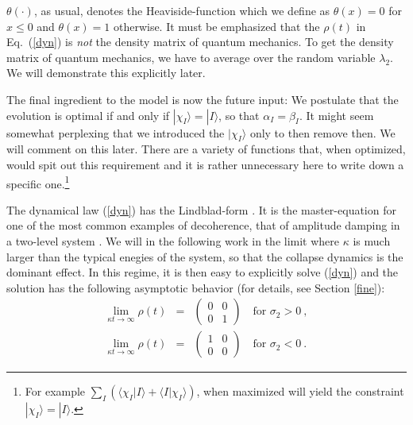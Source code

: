 \documentclass[12pt]{article}
\def\beqn{\begin{eqnarray}}
\def\eeqn{\end{eqnarray}}
\begin{document}
$\theta(\cdot)$, as usual, denotes the Heaviside-function which we define as $\theta(x) = 0$ for $x \leq 0$ and $\theta(x) =1$ otherwise.
It must be emphasized that the $\rho(t)$ in Eq.\ (\ref{dyn}) is {\it not} the density matrix of quantum mechanics. To get the density matrix of quantum mechanics, we have to average over the random variable $\lambda_2$. We will demonstrate this explicitly later. 

The final ingredient to the model is now the future input: We postulate that the evolution is optimal if and only if $|\chi_I \rangle = |I \rangle$, so that $\alpha_I = \beta_I$. It might seem somewhat perplexing that we introduced the $|\chi_I \rangle$ only to then remove then. We will comment on this later. There are a variety of functions that, when optimized, would spit out this requirement and it is rather unnecessary here to write down a specific one.\footnote{For example $\sum_I (\langle \chi_I|I\rangle + \langle I | \chi_I\rangle)$, when maximized will yield the constraint $|\chi_I\rangle = |I\rangle$. } 

The dynamical law (\ref{dyn}) has the Lindblad-form \cite{Lindblad,Gorini}. It is the master-equation for one of the most common examples of decoherence, that of amplitude damping in a two-level system \cite{Nielsen}. We will in the following work in the limit where $\kappa$ is much larger than the typical enegies of the system, so that the collapse dynamics is the dominant effect. In this regime, it is then easy to explicitly solve (\ref{dyn}) and the solution has the following asymptotic behavior (for details, see Section \ref{fine}):
\beqn
\lim_{\kappa t \to \infty} \rho (t) &=& \begin{pmatrix}
0 & 0 \\
0 & 1
\end{pmatrix} \quad \mbox{for $\sigma_2 > 0$}~, \\
\lim_{\kappa t \to \infty} \rho (t) &=& \begin{pmatrix}
1 & 0 \\
0 & 0
\end{pmatrix} \quad \mbox{for $\sigma_2 < 0$}~. \label{limits2}
\eeqn
\end{document}

